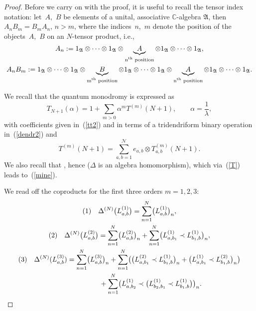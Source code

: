 \documentclass[pdftex]{sigma}
\numberwithin{equation}{section}
\theoremstyle{definition}
\newcommand{\id}{\operatorname{id}}
\begin{document}
\begin{proof}
Before we carry on with the proof, it is useful to recall the tensor index notation: let~$A$,~$B$ be elements of a unital, associative ${\mathbb C}$-algebra
${\mathfrak A}$, then $A_n B_m = B_m A_n$, $n>m$, where the indices~$n$,~$m$ denote the position of the objects~$A$,~$B$ on an $N$-tensor product, i.e.,
\begin{gather}
 A_n := 1_{\mathfrak A} \otimes \dots\otimes 1_{\mathfrak A}\otimes \underbrace{A}_{\text{n$^{\rm th}$ position}} \otimes 1_{\mathfrak A}\otimes \dots \otimes 1_{\mathfrak A}, \label{nota}\\
 A_n B_m :=1_{\mathfrak A} \otimes \dots\otimes 1_{\mathfrak A}\otimes \underbrace{B}_{\text{m$^{\rm th}$ position}} \otimes 1_{\mathfrak A}\otimes \dots\otimes 1_{\mathfrak A} \otimes \underbrace{A}_{\text{n$^{\rm th}$ position}} \otimes 1_{\mathfrak A} \otimes\dots \otimes 1_{\mathfrak A}.\nonumber%
\end{gather}

We recall that the quantum monodromy is expressed as
\[
T_{N+1}(\alpha)\! =\! 1 + \sum_{m>0} \alpha^m T^{(m)}(N+1) , \qquad \alpha = \frac{1}{\lambda},
\]
 with coefficients given in~(\ref{tt2}) and in terms of a tridendriform binary operation in~(\ref{dendr2}) and
 \[
 T^{(m)}(N+1) = \sum_{a,b =1}^{{\mathcal N}} e_{a,b} \otimes T_{a,b}^{(m)}(N+1).
 \]
 We also recall that \smash{$T_{N+1}(\lambda)= \bigl(\id \otimes \Delta^{(N)}\bigr){\mathbb L}(\lambda)$}, hence  ($\Delta$ is an algebra homomorphism), which via~(\ref{T}) leads to~(\ref{mine}).

We read off the coproducts for the first three orders $m=1,2,3$:
\begin{gather*}
(1) \quad \displaystyle\Delta^{(N)}\bigl(L^{(1)}_{a,b}\bigr) = \sum_{n=1}^N \bigl(L^{(1)}_{a,b}\bigr)_n ,\\
 (2) \quad \Delta^{(N)}\bigl(L^{(2)}_{a,b}\bigr) = \sum_{n=1}^N \bigl(L^{(2)}_{a,b}\bigr)_n + \sum_{n=1}^N \bigl( L^{(1)}_{a,b_1} \prec L^{(1)}_{b_1, b} \bigr)_n,\\
(3) \quad \Delta^{(N)}(L^{(3)}_{a,b}) = \sum_{n=1}^N \bigl(L^{(3)}_{a,b}\bigr)_n + \sum_{n=1}^N \bigl( \bigl( L^{(2)}_{a,b_1} \prec L^{(1)}_{b_1, b} \bigr)_n+ \bigl( L^{(1)}_{a,b_1} \prec L^{(2)}_{b_1, b} \bigr)_n\bigr)\\ \hphantom{(3) \quad \Delta^{(N)}(L^{(3)}_{a,b}) =}{} + \sum_{n=1}^N \bigl( L^{(1)}_{a,b_2} \prec \bigl(L^{(1)}_{b_2, b_1} \prec L^{(1)}_{b_1, b} \bigr)\bigr)_n .\tag*{\qed}
\end{gather*}
\renewcommand{\qed}{}
\end{proof}
\end{document}
